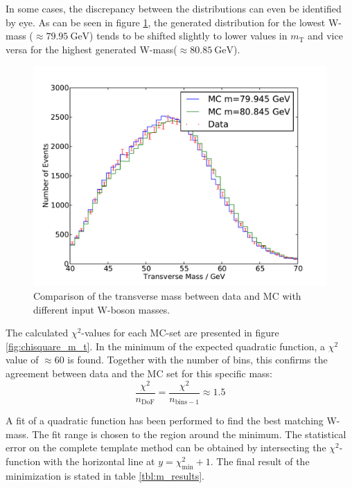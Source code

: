 \documentclass[
	paper=A4,
	parskip=full,
	chapterprefix=true,
	11pt,
	headings=normal,
	bibliography=totoc,
	listof=totoc,
	titlepage=on,
]{scrreprt}
\newcommand{\MT}{\ensuremath{{m_\mathrm{T}}}\xspace}
\begin{document}
In some cases, the discrepancy between the distributions can even be identified by eye. As can be seen in figure \ref{fig:comparison_m_t}, the generated distribution for the lowest W-mass ($\approx\SI{79.95}{\giga\electronvolt}$) tends to be shifted slightly to lower values in \MT and vice versa for the highest generated W-mass($\approx\SI{80.85}{\giga\electronvolt}$). 
\begin{figure}
	\centering
	\includegraphics{comparison_m_t}
	\caption{Comparison of the transverse mass between data and MC with different input W-boson masses.}
	\label{fig:comparison_m_t}
\end{figure}

The calculated $\chi^2$-values for each MC-set are presented in figure \ref{fig:chisquare_m_t}. In the minimum of the expected quadratic function, a $\chi^2 $ value of $\approx 60$ is found. Together with the number of bins, this confirms the agreement between data and the MC set for this specific mass:
\begin{equation}
\frac{\chi^2}{n_{\mathrm{DoF}}} = \frac{\chi^2}{n_{\mathrm{bins}-1}} \approx 1.5 
\end{equation}

A fit of a quadratic function has been performed to find the best matching W-mass. The fit range is chosen to the region around the minimum. The statistical error on the complete template method can be obtained by intersecting the $\chi^2$-function with the horizontal line at $y=\chi^2_{\mathrm{min}}+1$. The final result of the minimization is stated in table \ref{tbl:m_results}.
\end{document}
